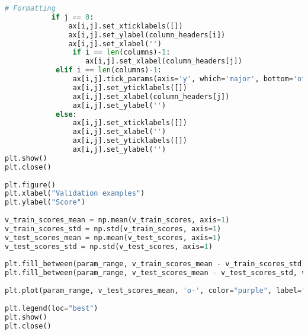 \begin{lstlisting}[language=python]
           # Formatting
           if j == 0:
               ax[i,j].set_xticklabels([])
               ax[i,j].set_ylabel(column_headers[i])
               ax[i,j].set_xlabel('')
                if i == len(columns)-1:
                   ax[i,j].set_xlabel(column_headers[j])
            elif i == len(columns)-1:
                ax[i,j].tick_params(axis='y', which='major', bottom='off')
                ax[i,j].set_yticklabels([])
                ax[i,j].set_xlabel(column_headers[j])
                ax[i,j].set_ylabel('')            
            else:
                ax[i,j].set_xticklabels([])
                ax[i,j].set_xlabel('')            
                ax[i,j].set_yticklabels([])
                ax[i,j].set_ylabel('')
plt.show()
plt.close()
 
plt.figure()
plt.xlabel("Validation examples")
plt.ylabel("Score")
 
v_train_scores_mean = np.mean(v_train_scores, axis=1)
v_train_scores_std = np.std(v_train_scores, axis=1)
v_test_scores_mean = np.mean(v_test_scores, axis=1)
v_test_scores_std = np.std(v_test_scores, axis=1)
 
plt.fill_between(param_range, v_train_scores_mean - v_train_scores_std, v_train_scores_mean + v_train_scores_std, alpha=0.1, color="orange")
plt.fill_between(param_range, v_test_scores_mean - v_test_scores_std, v_test_scores_mean + v_test_scores_std, alpha=0.1, color="purple")plt.plot(param_range, v_train_scores_mean, 'o-', color="orange", label="Training score")
 
plt.plot(param_range, v_test_scores_mean, 'o-', color="purple", label="Cross-validation score")
 
plt.legend(loc="best")
plt.show()
plt.close()
\end{lstlisting}